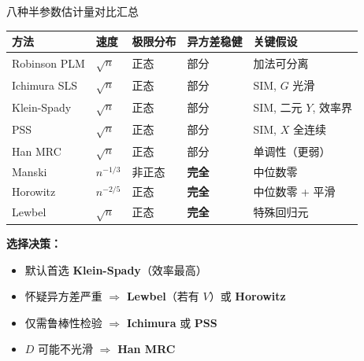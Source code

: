 \documentclass[aspectratio=169, 10pt]{beamer}
\begin{document}
\begin{frame}{八种半参数估计量对比汇总}

  \begin{center}\scriptsize
  \begin{tabular}{p{2.4cm}|p{1.5cm}|p{2cm}|p{1.5cm}|p{4cm}}
  \hline
  方法 & 速度 & 极限分布 & 异方差稳健 & 关键假设 \\
  \hline
  Robinson PLM & $\sqrt{n}$ & 正态 & 部分 & 加法可分离 \\
  Ichimura SLS & $\sqrt{n}$ & 正态 & 部分 & SIM, $G$ 光滑 \\
  Klein-Spady & $\sqrt{n}$ & 正态 & 部分 & SIM, 二元 $Y$, 效率界 \\
  PSS & $\sqrt{n}$ & 正态 & 部分 & SIM, $X$ 全连续 \\
  Han MRC & $\sqrt{n}$ & 正态 & 部分 & 单调性（更弱）\\
  Manski & $n^{-1/3}$ & 非正态 & \textbf{完全} & 中位数零 \\
  Horowitz & $n^{-2/5}$ & 正态 & \textbf{完全} & 中位数零 + 平滑 \\
  Lewbel & $\sqrt{n}$ & 正态 & \textbf{完全} & 特殊回归元 \\
  \hline
  \end{tabular}
  \end{center}

  \begin{highlightbox}
    \textbf{选择决策：}
    \begin{itemize}\setlength{\itemsep}{1pt}
      \item 默认首选 \textbf{Klein-Spady}（效率最高）
      \item 怀疑异方差严重 $\Rightarrow$ \textbf{Lewbel}（若有 $V$）或 \textbf{Horowitz}
      \item 仅需鲁棒性检验 $\Rightarrow$ \textbf{Ichimura} 或 \textbf{PSS}
      \item $D$ 可能不光滑 $\Rightarrow$ \textbf{Han MRC}
    \end{itemize}
  \end{highlightbox}

\end{frame}
\end{document}
